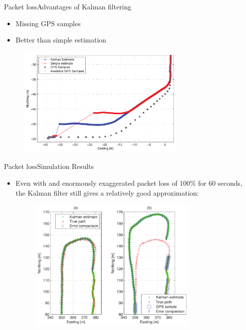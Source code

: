 
	\begin{frame}{Packet loss}{Advantages of Kalman filtering}
		\begin{itemize}
			\item Missing GPS samples
			\item Better than simple estimation 
		\end{itemize}
		\begin{figure}
			\begin{center}
				\includegraphics[width=8.2cm]{img/kalmanestimate}
				\label{fig:kalmanestimate}
			\end{center}
		\end{figure}
	\end{frame}
		

	\begin{frame}{Packet loss}{Simulation Results}
	  \begin{itemize}
	  	\item Even with and enormously exaggerated packet loss of 100\% for 60 seconds, the Kalman filter still gives a relatively good approximation:
		\begin{figure}
			\begin{center}
				\includegraphics[width=8.2cm]{img/track}
				\label{fig:packetloss}
			\end{center}
		\end{figure}
	  \end{itemize}
	\end{frame}

